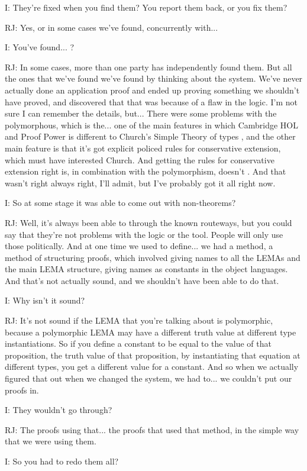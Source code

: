 \documentclass[10pt,titlepage]{book}
\begin{document}
I: They're fixed when you find them? You report them back, or you fix them?

RJ: Yes, or in some cases we've found, concurrently with...

I: You've found... ?

RJ: In some cases, more than one party has independently found them. But all the ones that we've found we've found by thinking about the system. We've never actually done an application proof and ended up proving something we shouldn't have proved, and discovered that that was because of a flaw in the logic. I'm not sure I can remember the details, but... There were some problems with the polymorphous, which is the... one of the main features in which Cambridge HOL and Proof Power is different to Church's Simple Theory of types	, and the other main feature is that it's got explicit policed rules for conservative extension, which must have interested Church. And getting the rules for conservative extension right is, in combination with the polymorphism, doesn't	. And that wasn't right always right, I'll admit, but I've probably got it all right now.

I: So at some stage it was able to come out with non-theorems?

RJ: Well, it's always been able to through the known routeways, but you could say that they're not problems with the logic or the tool. People will only use those politically. And at one time we used to define... we had a method, a method of structuring proofs, which involved giving names to all the LEMAs and the main LEMA structure, giving names as constants in the object languages. And that's not actually sound, and we shouldn't have been able to do that.

I: Why isn't it sound?

RJ: It's not sound if the LEMA that you're talking about is polymorphic, because a polymorphic LEMA may have a different truth value at different type instantiations. So if you define a constant to be equal to the value of that proposition, the truth value of that proposition, by instantiating that equation at different types, you get a different value for a constant. And so when we actually figured that out when we changed the system, we had to... we couldn't put our proofs in.

I: They wouldn't go through?

RJ: The proofs using that... the proofs that used that method, in the simple way that we were using them.

I: So you had to redo them all?
\end{document}
